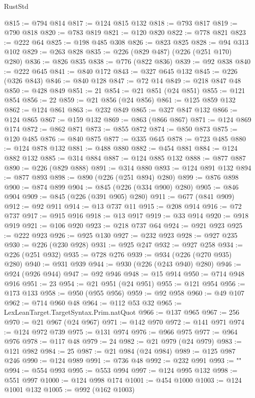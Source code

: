 \begin{lexlean}{RustStd}
\begin{coremodule}
@815 := @794 @814
@817 := @124 @815 @132
@818 := @793 @817
@819 := @790 @818
@820 := @783 @819
@821 := @120 @820
@822 := @778 @821
@823 := @222 @64
@825 := @198 @485 @308
@826 := @823 @825
@828 := @94 @313 @102
@829 := @263 @828
@835 := @226 (@829 @487) (@226 (@251 @170) @280)
@836 := @826 @835
@838 := @776 (@822 @836)
@839 := @92 @838
@840 := @222 @645
@841 := @840 @172
@843 := @327 @645 @132
@845 := @226 (@326 @843)
@846 := @840 @128
@847 := @72 @14
@849 := @218 @847 @48
@850 := @428 @849
@851 := 21
@854 := @21 @851 (@24 @851)
@855 := @121 @854
@856 := 22
@859 := @21 @856 (@24 @856)
@861 := @125 @859 @132
@862 := @124 @861
@863 := @232 @849
@865 := @327 @847 @132
@866 := @124 @865
@867 := @159 @132
@869 := @863 (@866 @867)
@871 := @124 @869 @174
@872 := @862 @871
@873 := @855 @872
@874 := @850 @873
@875 := @120 @485
@876 := @840 @875
@877 := @335 @645
@878 := @723 @485
@880 := @124 @878 @132
@881 := @488 @880
@882 := @454 @881
@884 := @124 @882 @132
@885 := @314 @884
@887 := @124 @885 @132
@888 := @877 @887
@890 := @226 (@829 @888)
@891 := @314 @880
@893 := @124 @891 @132
@894 := @877 @893
@898 := @890 (@226 (@251 @894) @280)
@899 := @876 @898
@900 := @874 @899
@904 := @845 (@226 (@334 @900) @280)
@905 := @846 @904
@909 := @845 (@226 (@391 @905) @280)
@911 := @677 (@841 @909)
@912 := @92 @911
@914 := @13 @737 @11
@915 := @208 @914
@916 := @72 @737
@917 := @915 @916
@918 := @13 @917
@919 := @33 @914
@920 := @918 @919
@921 := @106 @920
@923 := @218 @737 @64
@924 := @921 @923
@925 := @222 @923
@926 := @925 @130
@927 := @232 @923
@928 := @927 @235
@930 := @226 (@230 @928)
@931 := @925 @247
@932 := @927 @258
@934 := @226 (@251 @932)
@935 := @728 @276
@939 := @934 (@226 (@270 @935) @280)
@940 := @931 @939
@944 := @930 (@226 (@243 @940) @280)
@946 := @924 (@926 @944)
@947 := @92 @946
@948 := @15 @914
@950 := @714 @948 @916
@951 := 23
@954 := @21 @951 (@24 @951)
@955 := @121 @954
@956 := @173 @133
@958 := @950 (@955 @956)
@959 := @92 @958
@960 := @49 @107
@962 := @714 @960 @48
@964 := @112 @53 @32
@965 := LexLeanTarget.TargetSyntax.Prim.natQuot
@966 := @137 @965
@967 := 256
@970 := @21 @967 (@24 @967)
@971 := @142 @970
@972 := @141 @971
@974 := @124 @972 @739
@975 := @131 @974
@976 := @966 @975
@977 := @964 @976
@978 := @117 @48
@979 := 24
@982 := @21 @979 (@24 @979)
@983 := @121 @982
@984 := 25
@987 := @21 @984 (@24 @984)
@989 := @125 @987 @246
@990 := @124 @989
@991 := @736 @48
@992 := @232 @991
@993 := "\n"
@994 := @554 @993
@995 := @553 @994
@997 := @124 @995 @132
@998 := @551 @997
@1000 := @124 @998 @174
@1001 := @454 @1000
@1003 := @124 @1001 @132
@1005 := @992 (@162 @1003)

\end{coremodule}
\end{lexlean}
